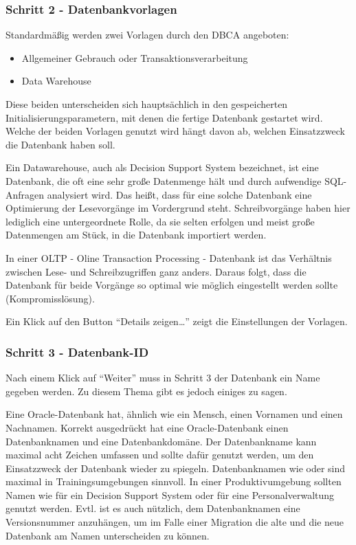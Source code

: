         \subsubsection{Schritt 2 - Datenbankvorlagen}
          Standardm\"a\ss{}ig werden zwei Vorlagen durch den DBCA angeboten:
          \begin{itemize}
            \item Allgemeiner Gebrauch oder Transaktionsverarbeitung
            \item Data Warehouse
          \end{itemize}
          Diese beiden unterscheiden sich haupts\"achlich in den gespeicherten Initialisierungsparametern, mit denen die fertige Datenbank gestartet wird. Welche der beiden Vorlagen genutzt wird h\"angt davon ab, welchen Einsatzzweck die Datenbank haben soll.

          Ein Datawarehouse, auch als Decision Support System bezeichnet, ist eine Datenbank, die oft eine sehr gro\ss{}e Datenmenge h\"alt und durch aufwendige SQL-Anfragen analysiert wird. Das hei\ss{}t, dass f\"ur eine solche Datenbank eine Optimierung der Lesevorg\"ange im Vordergrund steht. Schreibvorg\"ange haben hier lediglich eine untergeordnete Rolle, da sie selten erfolgen und meist gro\ss{}e Datenmengen am St\"uck, in die Datenbank importiert werden.

          In einer OLTP - Oline Transaction Processing - Datenbank ist das Verh\"altnis zwischen Lese- und Schreibzugriffen ganz anders. Daraus folgt, dass die Datenbank f\"ur beide Vorg\"ange so optimal wie m\"oglich eingestellt werden sollte (Kompromissl\"osung).

          Ein Klick auf den Button \enquote{Details zeigen\dots} zeigt die Einstellungen der Vorlagen.

        \subsubsection{Schritt 3 - Datenbank-ID}
          Nach einem Klick auf \enquote{Weiter} muss in Schritt 3 der Datenbank ein Name gegeben werden. Zu diesem Thema gibt es jedoch einiges zu sagen.

          Eine Oracle-Datenbank hat, \"ahnlich wie ein Mensch, einen Vornamen und einen Nachnamen. Korrekt ausgedr\"uckt hat eine Oracle-Datenbank einen Datenbanknamen und eine Datenbankdom\"ane. Der Datenbankname kann maximal acht Zeichen umfassen und sollte daf\"ur genutzt werden, um den Einsatzzweck der Datenbank wieder zu spiegeln. Datenbanknamen wie  oder  sind maximal in Trainingsumgebungen sinnvoll. In einer Produktivumgebung sollten Namen wie  f\"ur ein Decision Support System oder  f\"ur eine Personalverwaltung genutzt werden. Evtl. ist es auch n\"utzlich, dem Datenbanknamen eine Versionsnummer anzuh\"angen, um im Falle einer Migration die alte und die neue Datenbank am Namen unterscheiden zu k\"onnen.

